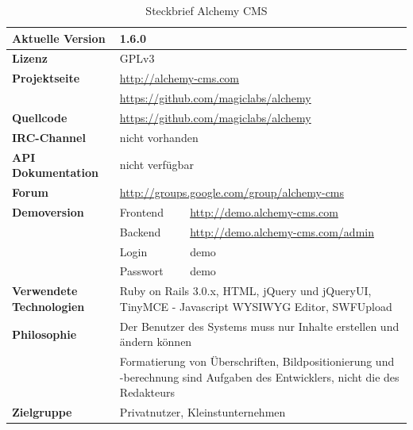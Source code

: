 \begin{table}[!ht]
\caption{Steckbrief Alchemy CMS}
\label{table:alchemy}
\begin{tabular}[!ht]{|l|l|l|}
\hline
\textbf{Aktuelle Version} & \multicolumn{2}{p{10cm}|}{1.6.0} \\
\hline
\textbf{Lizenz} & \multicolumn{2}{p{10cm}|}{GPLv3} \\
\hline
\textbf{Projektseite} & \multicolumn{2}{p{10cm}|}{\href{http://alchemy-cms.com}{http://alchemy-cms.com}} \\
 & \multicolumn{2}{p{10cm}|}{\href{https://github.com/magiclabs/alchemy}{https://github.com/magiclabs/alchemy}} \\
\hline
\textbf{Quellcode} & \multicolumn{2}{p{10cm}|}{\href{https://github.com/magiclabs/alchemy}{https://github.com/magiclabs/alchemy}} \\
\hline
\textbf{IRC-Channel} & \multicolumn{2}{p{10cm}|}{nicht vorhanden} \\
\hline
\textbf{API Dokumentation} & \multicolumn{2}{p{10cm}|}{nicht verfügbar} \\
\hline
\textbf{Forum} & \multicolumn{2}{p{10cm}|}{\href{http://groups.google.com/group/alchemy-cms}{http://groups.google.com/group/alchemy-cms}} \\
\hline
\textbf{Demoversion} & Frontend & \href{http://demo.alchemy-cms.com}{http://demo.alchemy-cms.com} \\
\cline{2-3}
& Backend & \href{http://demo.alchemy-cms.com/admin}{http://demo.alchemy-cms.com/admin} \\
\cline{2-3}
& Login & demo \\
\cline{2-3}
& Passwort & demo \\
\hline
\textbf{Verwendete Technologien} & \multicolumn{2}{p{10cm}|}{Ruby on Rails 3.0.x, HTML, jQuery und jQueryUI, TinyMCE - Javascript WYSIWYG Editor, SWFUpload} \\
\hline
\textbf{Philosophie} & \multicolumn{2}{p{10cm}|}{Der Benutzer des Systems muss nur Inhalte erstellen und ändern können} \\
& \multicolumn{2}{p{10cm}|}{Formatierung von Überschriften, Bildpositionierung und -berechnung sind Aufgaben des Entwicklers, nicht die des Redakteurs}\\
\hline
\textbf{Zielgruppe} & \multicolumn{2}{p{10cm}|}{Privatnutzer, Kleinstunternehmen} \\
\hline
\end{tabular}
\end{table}

